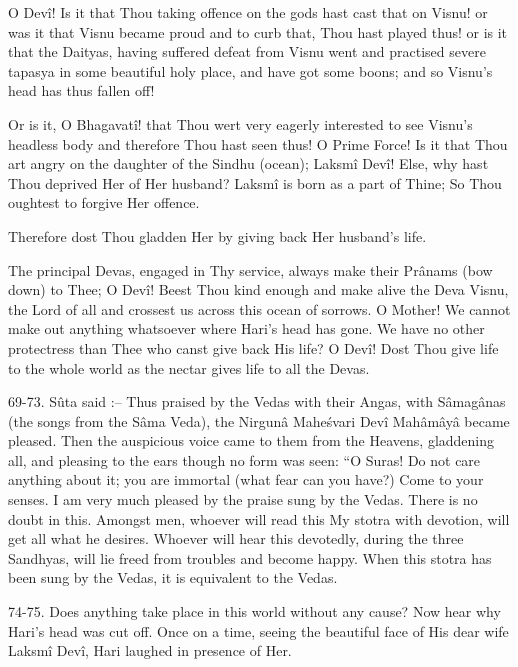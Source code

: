 O Dev\^i! Is it that Thou taking offence on the gods hast cast that on Visnu! or was it that Visnu became proud and to curb that, Thou hast played thus! or is it that the Daityas, having suffered defeat from Visnu went and practised severe tapasya in some beautiful holy place, and have got some boons; and so Visnu's head has thus fallen off!

Or is it, O Bhagavat\^i! that Thou wert very eagerly interested to see Visnu's headless body and therefore Thou hast seen thus! O Prime Force! Is it that Thou art angry on the daughter of the Sindhu (ocean); Laksm\^i Dev\^i! Else, why hast Thou deprived Her of Her husband? Laksm\^i is born as a part of Thine; So Thou oughtest to forgive Her offence.

Therefore dost Thou gladden Her by giving back Her husband's life.

The principal Devas, engaged in Thy service, always make their Pr\^anams (bow down) to Thee; O Dev\^i! Beest Thou kind enough and make alive the Deva Visnu, the Lord of all and crossest us across this ocean of sorrows. O Mother! We cannot make out anything whatsoever where Hari's head has gone. We have no other protectress than Thee who canst give back His life? O Dev\^i! Dost Thou give life to the whole world as the nectar gives life to all the Devas.

69-73. S\^uta said :-- Thus praised by the Vedas with their Angas, with S\^amag\^anas (the songs from the S\^ama Veda), the Nirgun\^a Mahe\'svari Dev\^i Mah\^am\^ay\^a became pleased. Then the auspicious voice came to them from the Heavens, gladdening all, and pleasing to the ears though no form was seen: ``O Suras! Do not care anything about it; you are immortal (what fear can you have?) Come to your senses. I am very much pleased by the praise sung by the Vedas. There is no doubt in this. Amongst men, whoever will read this My stotra with devotion, will get all what he desires. Whoever will hear this devotedly, during the three Sandhyas, will lie freed from troubles and become happy. When this stotra has been sung by the Vedas, it is equivalent to the Vedas.

74-75. Does anything take place in this world without any cause? Now hear why Hari's head was cut off. Once on a time, seeing the beautiful face of His dear wife Laksm\^i Dev\^i, Hari laughed in presence of Her.

